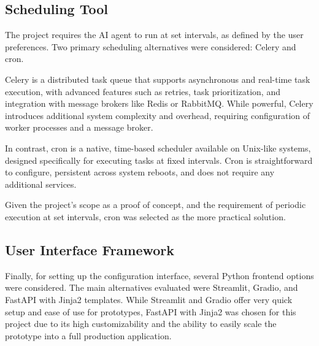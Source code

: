 \documentclass[a4paper]{report}
\begin{document}
\subsection{Scheduling Tool}

The project requires the AI agent to run at set intervals, as defined by the user preferences. Two primary scheduling alternatives were considered: Celery and cron.

Celery is a distributed task queue that supports asynchronous and real-time task execution, with advanced features such as retries, task prioritization, and integration with message brokers like Redis or RabbitMQ. While powerful, Celery introduces additional system complexity and overhead, requiring configuration of worker processes and a message broker.

In contrast, cron is a native, time-based scheduler available on Unix-like systems, designed specifically for executing tasks at fixed intervals. Cron is straightforward to configure, persistent across system reboots, and does not require any additional services.

Given the project's scope as a proof of concept, and the requirement of periodic execution at set intervals, cron was selected as the more practical solution.

\subsection{User Interface Framework}

Finally, for setting up the configuration interface, several Python frontend options were considered. The main alternatives evaluated were Streamlit, Gradio, and FastAPI with Jinja2 templates. While Streamlit and Gradio offer very quick setup and ease of use for prototypes, FastAPI with Jinja2 was chosen for this project due to its high customizability and the ability to easily scale the prototype into a full production application.
\end{document}
